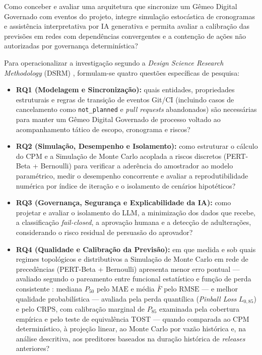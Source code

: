 \documentclass[12pt,openany,oneside,a4paper,english,brazilian,sumario=tradicional]{abntex2}
\begin{document}
\begin{citacao}
Como conceber e avaliar uma arquitetura que sincronize um Gêmeo Digital Governado com eventos do projeto, integre simulação estocástica de cronogramas e assistência interpretativa por IA generativa e permita avaliar a calibração das previsões em redes com dependências convergentes e a contenção de ações não autorizadas por governança determinística?
\end{citacao}

Para operacionalizar a investigação segundo a \textit{Design Science Research Methodology} (DSRM) \cite{peffers2007}, formulam-se quatro questões específicas de pesquisa:

\begin{itemize}
  \item \textbf{RQ1 (Modelagem e Sincronização):} quais entidades, propriedades estruturais e regras de transição de eventos Git/CI (incluindo casos de cancelamento como \texttt{not\_planned} e \textit{pull requests} abandonados) são necessárias para manter um Gêmeo Digital Governado de processo voltado ao acompanhamento tático de escopo, cronograma e riscos?
  \item \textbf{RQ2 (Simulação, Desempenho e Isolamento):} como estruturar o cálculo do CPM e a Simulação de Monte Carlo acoplada a riscos discretos (PERT-Beta + Bernoulli) para verificar a aderência do amostrador ao modelo paramétrico, medir o desempenho concorrente e avaliar a reprodutibilidade numérica por índice de iteração e o isolamento de cenários hipotéticos?
  \item \textbf{RQ3 (Governança, Segurança e Explicabilidade da IA):} como projetar e avaliar o isolamento do LLM, a minimização dos dados que recebe, a classificação \textit{fail-closed}, a aprovação humana e a detecção de adulterações, considerando o risco residual de persuasão do aprovador?
  \item \textbf{RQ4 (Qualidade e Calibração da Previsão):} em que medida e sob quais regimes topológicos e distributivos a Simulação de Monte Carlo em rede de precedências (PERT-Beta + Bernoulli) apresenta menor erro pontual --- avaliado segundo o pareamento entre funcional estatístico e função de perda consistente \cite{gneiting2011}: mediana $P_{50}$ pelo $\mathrm{MAE}$ e média $\bar{F}$ pelo $\mathrm{RMSE}$ --- e melhor qualidade probabilística --- avaliada pela perda quantílica (\textit{Pinball Loss} $L_{0{,}85}$) e pelo $\mathrm{CRPS}$, com calibração marginal de $P_{85}$ examinada pela cobertura empírica e pelo teste de equivalência TOST \cite{schuirmann1987} --- quando comparada ao CPM determinístico, à projeção linear, ao Monte Carlo por vazão histórica \cite{vacanti2015} e, na análise descritiva, aos preditores baseados na duração histórica de \textit{releases} anteriores?
\end{itemize}
\end{document}
